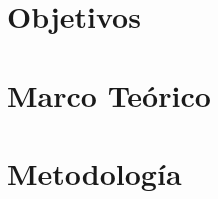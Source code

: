 \documentclass{article}
\begin{document}

\tableofcontents
\newpage

\section{Objetivos}



\section{Marco Teórico}



\section{Metodología}



\FloatBarrier


\printbibliography[heading=bibintoc, title={Bibliografía}]
\end{document}
